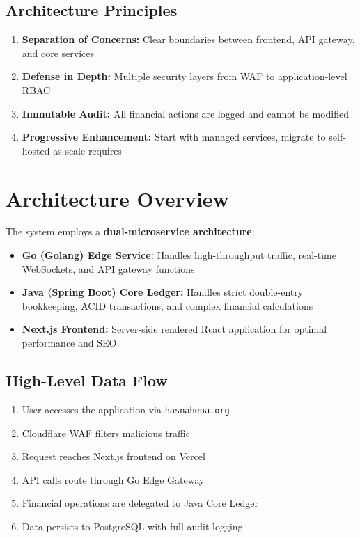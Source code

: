 \documentclass[11pt,a4paper]{article}
\begin{document}
\subsection{Architecture Principles}
\begin{enumerate}
    \item \textbf{Separation of Concerns:} Clear boundaries between frontend, API gateway, and core services
    \item \textbf{Defense in Depth:} Multiple security layers from WAF to application-level RBAC
    \item \textbf{Immutable Audit:} All financial actions are logged and cannot be modified
    \item \textbf{Progressive Enhancement:} Start with managed services, migrate to self-hosted as scale requires
\end{enumerate}

\section{Architecture Overview}

The system employs a \textbf{dual-microservice architecture}:
\begin{itemize}
    \item \textbf{Go (Golang) Edge Service:} Handles high-throughput traffic, real-time WebSockets, and API gateway functions
    \item \textbf{Java (Spring Boot) Core Ledger:} Handles strict double-entry bookkeeping, ACID transactions, and complex financial calculations
    \item \textbf{Next.js Frontend:} Server-side rendered React application for optimal performance and SEO
\end{itemize}

\subsection{High-Level Data Flow}
\begin{enumerate}
    \item User accesses the application via \texttt{hasnahena.org}
    \item Cloudflare WAF filters malicious traffic
    \item Request reaches Next.js frontend on Vercel
    \item API calls route through Go Edge Gateway
    \item Financial operations are delegated to Java Core Ledger
    \item Data persists to PostgreSQL with full audit logging
\end{enumerate}
\end{document}
